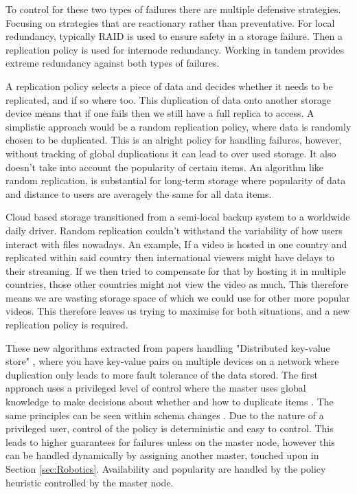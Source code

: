 \documentclass{UoYCSproject}
\begin{document}
To control for these two types of failures there are multiple defensive strategies.
Focusing on strategies that are reactionary rather than preventative.
For local redundancy, typically RAID is used to ensure safety in a storage failure.
Then a replication policy \cite{Avalability storage} is used for internode redundancy.
Working in tandem provides extreme redundancy against both types of failures.

A replication policy selects a piece of data and decides whether it needs to be replicated, and if so where too. 
This duplication of data onto another storage device means that if one fails then we still have a full replica to access. 
A simplistic approach would be a random replication policy, where data is randomly chosen to be duplicated.
This is an alright policy for handling failures, however, without tracking of global duplications it can lead to over used storage.
It also doesn’t take into account the popularity of certain items.
An algorithm like random replication, is substantial for long-term storage where popularity of data and distance to users are averagely the same for all data items.

Cloud based storage transitioned from a semi-local backup system to a worldwide daily driver.
Random replication couldn’t withstand the variability of how users interact with files nowadays.
An example, If a video is hosted in one country and replicated within said country then international viewers might have delays to their streaming.
If we then tried to compensate for that by hosting it in multiple countries, those other countries might not view the video as much.
This therefore means we are wasting storage space of which we could use for other more popular videos.
This therefore leaves us trying to maximise for both situations, and a new replication policy is required.

These new algorithms extracted from papers handling "Distributed key-value store" \cite{Key-Value}, where you have key-value pairs on multiple devices on a network where duplication only leads to more fault tolerance of the data stored. 
The first approach uses a privileged level of control where the master uses global knowledge to make decisions about whether and how to duplicate items \cite{Avalability storage, Patent}.
The same principles can be seen within schema changes \cite{Scheme changes}.
Due to the nature of a privileged user, control of the policy is deterministic and easy to control.
This leads to higher guarantees for failures unless on the master node, however this can be handled dynamically by assigning another master, touched upon in Section \ref{sec:Robotics}.
Availability and popularity are handled by the policy heuristic controlled by the master node.
\end{document}
